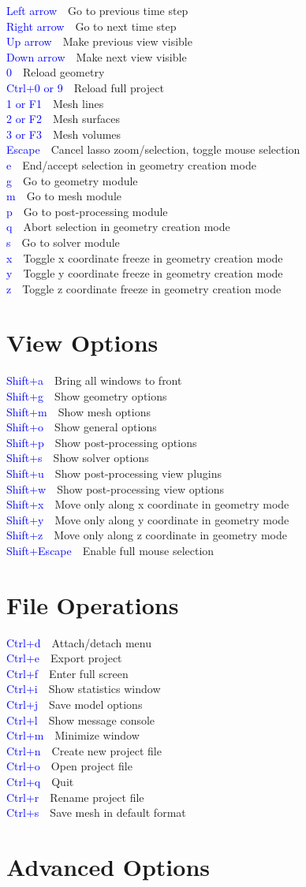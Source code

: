 \documentclass[10pt, twocolumn]{article}
\newcommand{\command}[2]{\textcolor{blue}{#1}~\dotfill{}~#2\\} %
\begin{document}
\command{Left arrow}{Go to previous time step}
\command{Right arrow}{Go to next time step}
\command{Up arrow}{Make previous view visible}
\command{Down arrow}{Make next view visible}
\command{0}{Reload geometry}
\command{Ctrl+0 or 9}{Reload full project}
\command{1 or F1}{Mesh lines}
\command{2 or F2}{Mesh surfaces}
\command{3 or F3}{Mesh volumes}
\command{Escape}{Cancel lasso zoom/selection, toggle mouse selection}
\command{e}{End/accept selection in geometry creation mode}
\command{g}{Go to geometry module}
\command{m}{Go to mesh module}
\command{p}{Go to post-processing module}
\command{q}{Abort selection in geometry creation mode}
\command{s}{Go to solver module}
\command{x}{Toggle x coordinate freeze in geometry creation mode}
\command{y}{Toggle y coordinate freeze in geometry creation mode}
\command{z}{Toggle z coordinate freeze in geometry creation mode}

\section*{View Options}

\command{Shift+a}{Bring all windows to front}
\command{Shift+g}{Show geometry options}
\command{Shift+m}{Show mesh options}
\command{Shift+o}{Show general options}
\command{Shift+p}{Show post-processing options}
\command{Shift+s}{Show solver options}
\command{Shift+u}{Show post-processing view plugins}
\command{Shift+w}{Show post-processing view options}
\command{Shift+x}{Move only along x coordinate in geometry mode}
\command{Shift+y}{Move only along y coordinate in geometry mode}
\command{Shift+z}{Move only along z coordinate in geometry mode}
\command{Shift+Escape}{Enable full mouse selection}

\section*{File Operations}

\command{Ctrl+d}{Attach/detach menu}
\command{Ctrl+e}{Export project}
\command{Ctrl+f}{Enter full screen}
\command{Ctrl+i}{Show statistics window}
\command{Ctrl+j}{Save model options}
\command{Ctrl+l}{Show message console}
\command{Ctrl+m}{Minimize window}
\command{Ctrl+n}{Create new project file}
\command{Ctrl+o}{Open project file}
\command{Ctrl+q}{Quit}
\command{Ctrl+r}{Rename project file}
\command{Ctrl+s}{Save mesh in default format}

\section*{Advanced Options}
\end{document}
